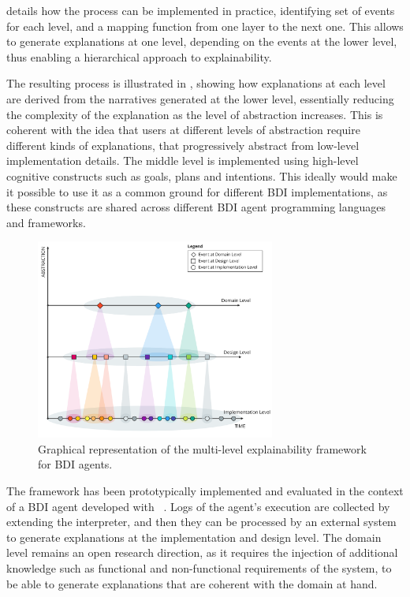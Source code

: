 \cite{DBLP:journals/aamas/YanBHR25} details how the process can be implemented in practice, identifying set of events for each level, and a mapping function from one layer to the next one.
%
This allows to generate explanations at one level, depending on the events at the lower level, thus enabling a hierarchical approach to explainability.

The resulting process is illustrated in , showing how explanations at each level are derived from the narratives generated at the lower level, essentially reducing the complexity of the explanation as the level of abstraction increases.
%
This is coherent with the idea that users at different levels of abstraction require different kinds of explanations, that progressively abstract from low-level implementation details.
%
The middle level is implemented using high-level cognitive constructs such as goals, plans and intentions.
%
This ideally would make it possible to use it as a common ground for different \ac{BDI} implementations, as these constructs are shared across different \ac{BDI} agent programming languages and frameworks.

\begin{figure}
    \centering
    \includegraphics[width=0.7\textwidth]{figures/multi-explain/agent-multi-level.pdf}
    \caption{Graphical representation of the multi-level explainability framework for \ac{BDI} agents.}
    \label{fig:multi-level-explainability}
\end{figure}

The framework has been prototypically implemented and evaluated in the context of a \ac{BDI} agent developed with \jason{}~\cite{Bordini_Hübner_Wooldridge_2007}. Logs of the agent's execution are collected by extending the \jason{} interpreter, and then they can be processed by an external system to generate explanations at the implementation and design level. 
%
The domain level remains an open research direction, as it requires the injection of additional knowledge such as functional and non-functional requirements of the system, to be able to generate explanations that are coherent with the domain at hand.



